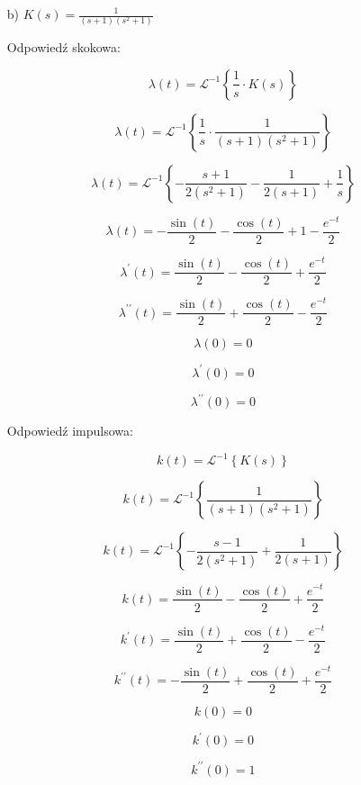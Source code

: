 \documentclass{article}
\begin{document}
\begin{enumerate}
    
    
    
    
    \item[b)]  $K(s)=\frac{1}{\left(s + 1\right) \left(s^{2} + 1\right)}$

    Odpowiedź skokowa:

    $$ \lambda(t)=\mathcal{L}^{-1}\left\{\frac{1}{s}\cdot K(s)\right\} $$

    $$ \lambda(t)=\mathcal{L}^{-1}\left\{\frac{1}{s}\cdot \frac{1}{\left(s + 1\right) \left(s^{2} + 1\right)}\right\} $$

    $$ \lambda(t)= \mathcal{L}^{-1}\left\{- \frac{s + 1}{2 \left(s^{2} + 1\right)} - \frac{1}{2 \left(s + 1\right)} + \frac{1}{s}
    \right\}$$

    $$ \lambda(t)=- \frac{\sin{\left(t \right)}}{2} - \frac{\cos{\left(t \right)}}{2} + 1 - \frac{e^{- t}}{2} $$

    $$ \lambda^{\prime}(t)=\frac{\sin{\left(t \right)}}{2} - \frac{\cos{\left(t \right)}}{2} + \frac{e^{- t}}{2}$$

    $$ \lambda^{\prime\prime}(t)=\frac{\sin{\left(t \right)}}{2} + \frac{\cos{\left(t \right)}}{2} - \frac{e^{- t}}{2}$$

    $$ \lambda(0)= 0 $$

    $$ \lambda^{\prime}(0)= 0 $$

    $$ \lambda^{\prime\prime}(0)= 0 $$

    \newpage


    Odpowiedź impulsowa:

    $$ k(t)=\mathcal{L}^{-1}\left\{K(s)\right\} $$

    $$ k(t)=\mathcal{L}^{-1}\left\{\frac{1}{\left(s + 1\right) \left(s^{2} + 1\right)}\right\} $$

    $$ k(t)=\mathcal{L}^{-1}\left\{- \frac{s - 1}{2 \left(s^{2} + 1\right)} + \frac{1}{2 \left(s + 1\right)}\right\} $$

    $$ k(t)=\frac{\sin{\left(t \right)}}{2} - \frac{\cos{\left(t \right)}}{2} + \frac{e^{- t}}{2}$$

    $$ k^{\prime}(t)=\frac{\sin{\left(t \right)}}{2} + \frac{\cos{\left(t \right)}}{2} - \frac{e^{- t}}{2}$$
    
    $$ k^{\prime\prime}(t)=- \frac{\sin{\left(t \right)}}{2} + \frac{\cos{\left(t \right)}}{2} + \frac{e^{- t}}{2}$$

    $$ k(0)=0$$

    $$ k^{\prime}(0)=0$$

    $$ k^{\prime\prime}(0)=1$$


\end{enumerate}
\end{document}
